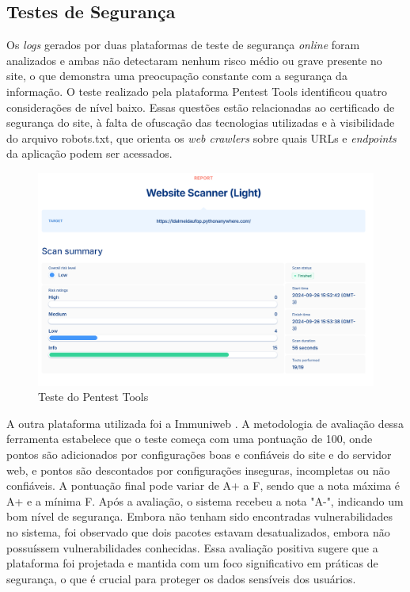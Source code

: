 \subsection{Testes de Segurança}

Os \textit{logs} gerados por duas plataformas de teste de segurança \textit{online} foram analizados e ambas não detectaram nenhum risco médio ou grave presente no site, o que demonstra uma preocupação constante com a segurança da informação. O teste realizado pela plataforma Pentest Tools \cite{Pentest} identificou quatro considerações de nível baixo. Essas questões estão relacionadas ao certificado de segurança do site, à falta de ofuscação das tecnologias utilizadas e à visibilidade do arquivo robots.txt, que orienta os \textit{web crawlers} sobre quais \ac{URLs} e \textit{endpoints} da aplicação podem ser acessados.

\begin{figure}[htb] \caption{\label{fig_grafico}Teste do Pentest Tools} \begin{center} \includegraphics[scale=0.3]{./img/pentest.png} \end{center}  \end{figure}

A outra plataforma utilizada foi a Immuniweb \cite{Immuniweb}. A metodologia de avaliação dessa ferramenta estabelece que o teste começa com uma pontuação de 100, onde pontos são adicionados por configurações boas e confiáveis do site e do servidor web, e pontos são descontados por configurações inseguras, incompletas ou não confiáveis. A pontuação final pode variar de A+ a F, sendo que a nota máxima é A+ e a mínima F. Após a avaliação, o sistema recebeu a nota "A-", indicando um bom nível de segurança. Embora não tenham sido encontradas vulnerabilidades no sistema, foi observado que dois pacotes estavam desatualizados, embora não possuíssem vulnerabilidades conhecidas. Essa avaliação positiva sugere que a plataforma foi projetada e mantida com um foco significativo em práticas de segurança, o que é crucial para proteger os dados sensíveis dos usuários.

